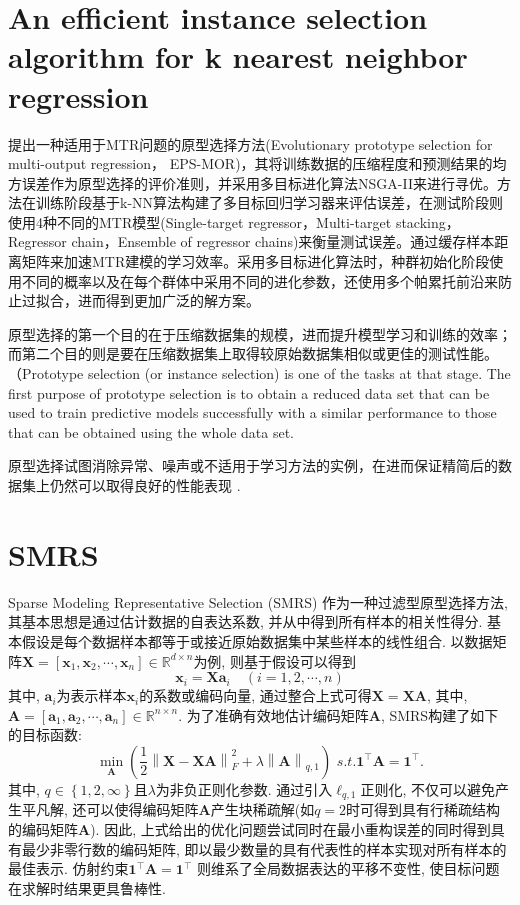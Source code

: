\documentclass[lang=cn,10pt]{gorgeousnbook}
\numberwithin{equation}{section}%
\numberwithin{figure}{section}%
\begin{document}
\section{An efficient instance selection algorithm for k nearest neighbor regression}
提出一种适用于MTR问题的原型选择方法(Evolutionary prototype selection for multi-output regression， EPS-MOR)，其将训练数据的压缩程度和预测结果的均方误差作为原型选择的评价准则，并采用多目标进化算法NSGA-II来进行寻优。方法在训练阶段基于k-NN算法构建了多目标回归学习器来评估误差，在测试阶段则使用4种不同的MTR模型(Single-target regressor，Multi-target stacking，Regressor chain，Ensemble of regressor chains)来衡量测试误差。通过缓存样本距离矩阵来加速MTR建模的学习效率。采用多目标进化算法时，种群初始化阶段使用不同的概率以及在每个群体中采用不同的进化参数，还使用多个帕累托前沿来防止过拟合，进而得到更加广泛的解方案。

原型选择的第一个目的在于压缩数据集的规模，进而提升模型学习和训练的效率；而第二个目的则是要在压缩数据集上取得较原始数据集相似或更佳的测试性能。（Prototype selection (or instance selection) is one of the tasks at that stage. The first purpose of prototype selection is to obtain a reduced data set that can be used to train predictive models successfully with a similar performance to those that can be obtained using the whole data set.

原型选择试图消除异常、噪声或不适用于学习方法的实例，在进而保证精简后的数据集上仍然可以取得良好的性能表现 .
\section{SMRS}
Sparse Modeling Representative Selection (SMRS)  作为一种过滤型原型选择方法, 其基本思想是通过估计数据的自表达系数, 并从中得到所有样本的相关性得分. 基本假设是每个数据样本都等于或接近原始数据集中某些样本的线性组合. 以数据矩阵$\bm{X}=\left[ \boldsymbol{x}_1,\boldsymbol{x}_2,\cdots ,\boldsymbol{x}_n \right] \in \mathbb{R} ^{d\times n}$为例, 则基于假设可以得到
\begin{equation}
\boldsymbol{x}_i=\boldsymbol{Xa}_i  \quad ( i=1,2,\cdots ,n)
\end{equation}
其中, $\bm{a}_i$为表示样本$\bm{x}_i$的系数或编码向量, 通过整合上式可得$\bm{X}=\bm{XA}$, 其中, $\bm{A} = \left[ \boldsymbol{a}_1,\boldsymbol{a}_2,\cdots ,\boldsymbol{a}_n \right] \in \mathbb{R} ^{n\times n}$. 为了准确有效地估计编码矩阵$\bm{A}$, SMRS构建了如下的目标函数:
\begin{equation}
\min_{\boldsymbol{A}} \left( \frac{1}{2}\left\| \boldsymbol{X}-\boldsymbol{XA} \right\| _{F}^{2}+\lambda \left\| \boldsymbol{A} \right\| _{q,1} \right) \,\,s.t.\mathbf{1}^{\top}\boldsymbol{A}=\boldsymbol{1}^{\top}.
\end{equation}
其中, $q\in\left\{1,2,\infty \right\} $且$\lambda$为非负正则化参数. 通过引入$\ell_{q,1}$正则化, 不仅可以避免产生平凡解, 还可以使得编码矩阵$\bm{A}$产生块稀疏解(如$q=2$时可得到具有行稀疏结构的编码矩阵$\bm{A}$). 因此, 上式给出的优化问题尝试同时在最小重构误差的同时得到具有最少非零行数的编码矩阵, 即以最少数量的具有代表性的样本实现对所有样本的最佳表示. 仿射约束$\mathbf{1}^{\top}\boldsymbol{A}=\boldsymbol{1}^{\top}$ 则维系了全局数据表达的平移不变性, 使目标问题在求解时结果更具鲁棒性. 
\end{document}
